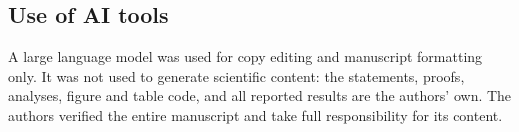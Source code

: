 \subsection*{Use of AI tools}

A large language model was used for copy editing and manuscript formatting only. It was not used to generate scientific content: the statements, proofs, analyses, figure and table code, and all reported results are the authors' own. The authors verified the entire manuscript and take full responsibility for its content.
